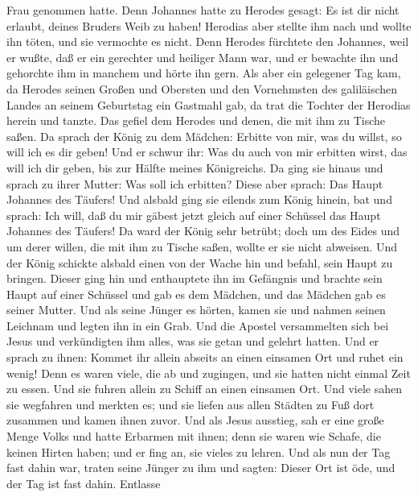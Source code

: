 Frau genommen hatte.  Denn Johannes hatte zu Herodes
gesagt: Es ist dir nicht erlaubt, deines Bruders Weib zu haben!
 Herodias aber stellte ihm nach und wollte ihn töten, und
sie vermochte es nicht.  Denn Herodes fürchtete den
Johannes, weil er wußte, daß er ein gerechter und heiliger Mann war, und
er bewachte ihn und gehorchte ihm in manchem und hörte ihn gern.
 Als aber ein gelegener Tag kam, da Herodes seinen Großen
und Obersten und den Vornehmsten des galiläischen Landes an seinem
Geburtstag ein Gastmahl gab,  da trat die Tochter der
Herodias herein und tanzte. Das gefiel dem Herodes und denen, die mit
ihm zu Tische saßen. Da sprach der König zu dem Mädchen: Erbitte von
mir, was du willst, so will ich es dir geben!  Und er
schwur ihr: Was du auch von mir erbitten wirst, das will ich dir geben,
bis zur Hälfte meines Königreichs.  Da ging sie hinaus
und sprach zu ihrer Mutter: Was soll ich erbitten? Diese aber sprach:
Das Haupt Johannes des Täufers!  Und alsbald ging sie
eilends zum König hinein, bat und sprach: Ich will, daß du mir gäbest
jetzt gleich auf einer Schüssel das Haupt Johannes des Täufers!
 Da ward der König sehr betrübt; doch um des Eides und um
derer willen, die mit ihm zu Tische saßen, wollte er sie nicht abweisen.
 Und der König schickte alsbald einen von der Wache hin
und befahl, sein Haupt zu bringen.  Dieser ging hin und
enthauptete ihn im Gefängnis und brachte sein Haupt auf einer Schüssel
und gab es dem Mädchen, und das Mädchen gab es seiner Mutter.
 Und als seine Jünger es hörten, kamen sie und nahmen
seinen Leichnam und legten ihn in ein Grab.  Und die
Apostel versammelten sich bei Jesus und verkündigten ihm alles, was sie
getan und gelehrt hatten.  Und er sprach zu ihnen: Kommet
ihr allein abseits an einen einsamen Ort und ruhet ein wenig! Denn es
waren viele, die ab und zugingen, und sie hatten nicht einmal Zeit zu
essen.  Und sie fuhren allein zu Schiff an einen einsamen
Ort.  Und viele sahen sie wegfahren und merkten es; und
sie liefen aus allen Städten zu Fuß dort zusammen und kamen ihnen zuvor.
 Und als Jesus ausstieg, sah er eine große Menge Volks
und hatte Erbarmen mit ihnen; denn sie waren wie Schafe, die keinen
Hirten haben; und er fing an, sie vieles zu lehren.  Und
als nun der Tag fast dahin war, traten seine Jünger zu ihm und sagten:
Dieser Ort ist öde, und der Tag ist fast dahin.  Entlasse
